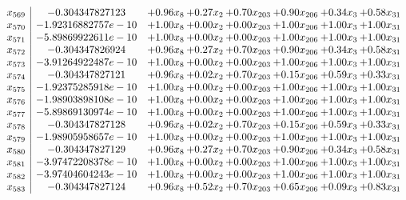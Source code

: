 \documentclass[8pt]{article}
\begin{document}
\[\begin{array}{c| c c@{\hskip 2pt} c@{\hskip 2pt} c@{\hskip 2pt} c@{\hskip 2pt} c@{\hskip 2pt} c@{\hskip 2pt} }
 x_{569}   &  -0.304347827123 & +  0.96 x_{8} & +  0.27 x_{2} & +  0.70 x_{203} & +  0.90 x_{206} & +  0.34 x_{3} & +  0.58 x_{31}\\
 x_{570}   &  -1.92316882757e-10 & +  1.00 x_{8} & +  0.00 x_{2} & +  0.00 x_{203} & +  1.00 x_{206} & +  1.00 x_{3} & +  1.00 x_{31}\\
 x_{571}   &  -5.89869922611e-10 & +  1.00 x_{8} & +  0.00 x_{2} & +  0.00 x_{203} & +  1.00 x_{206} & +  1.00 x_{3} & +  1.00 x_{31}\\
 x_{572}   &  -0.304347826924 & +  0.96 x_{8} & +  0.27 x_{2} & +  0.70 x_{203} & +  0.90 x_{206} & +  0.34 x_{3} & +  0.58 x_{31}\\
 x_{573}   &  -3.91264922487e-10 & +  1.00 x_{8} & +  0.00 x_{2} & +  0.00 x_{203} & +  1.00 x_{206} & +  1.00 x_{3} & +  1.00 x_{31}\\
 x_{574}   &  -0.304347827121 & +  0.96 x_{8} & +  0.02 x_{2} & +  0.70 x_{203} & +  0.15 x_{206} & +  0.59 x_{3} & +  0.33 x_{31}\\
 x_{575}   &  -1.92375285918e-10 & +  1.00 x_{8} & +  0.00 x_{2} & +  0.00 x_{203} & +  1.00 x_{206} & +  1.00 x_{3} & +  1.00 x_{31}\\
 x_{576}   &  -1.98903898108e-10 & +  1.00 x_{8} & +  0.00 x_{2} & +  0.00 x_{203} & +  1.00 x_{206} & +  1.00 x_{3} & +  1.00 x_{31}\\
 x_{577}   &  -5.89869130974e-10 & +  1.00 x_{8} & +  0.00 x_{2} & +  0.00 x_{203} & +  1.00 x_{206} & +  1.00 x_{3} & +  1.00 x_{31}\\
 x_{578}   &  -0.304347827128 & +  0.96 x_{8} & +  0.02 x_{2} & +  0.70 x_{203} & +  0.15 x_{206} & +  0.59 x_{3} & +  0.33 x_{31}\\
 x_{579}   &  -1.98905958657e-10 & +  1.00 x_{8} & +  0.00 x_{2} & +  0.00 x_{203} & +  1.00 x_{206} & +  1.00 x_{3} & +  1.00 x_{31}\\
 x_{580}   &  -0.304347827129 & +  0.96 x_{8} & +  0.27 x_{2} & +  0.70 x_{203} & +  0.90 x_{206} & +  0.34 x_{3} & +  0.58 x_{31}\\
 x_{581}   &  -3.97472208378e-10 & +  1.00 x_{8} & +  0.00 x_{2} & +  0.00 x_{203} & +  1.00 x_{206} & +  1.00 x_{3} & +  1.00 x_{31}\\
 x_{582}   &  -3.97404604243e-10 & +  1.00 x_{8} & +  0.00 x_{2} & +  0.00 x_{203} & +  1.00 x_{206} & +  1.00 x_{3} & +  1.00 x_{31}\\
 x_{583}   &  -0.304347827124 & +  0.96 x_{8} & +  0.52 x_{2} & +  0.70 x_{203} & +  0.65 x_{206} & +  0.09 x_{3} & +  0.83 x_{31}\\

\end{array}\]
\end{document}

